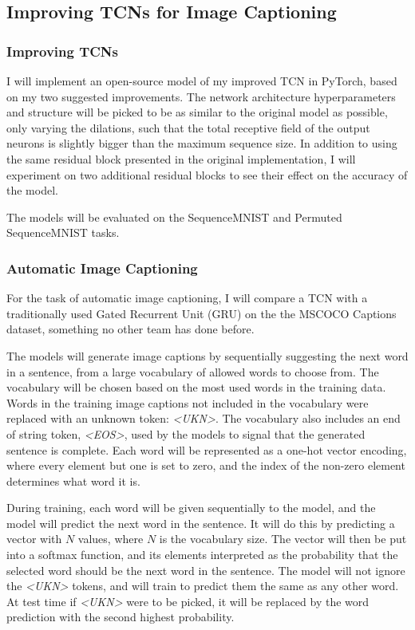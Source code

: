 \documentclass[a4paper, twoside]{article}
\begin{document}
\subsection{Improving TCNs for Image Captioning}
\subsubsection{Improving TCNs}
I will implement an open-source model of my improved TCN in PyTorch, based on my two suggested improvements. The network architecture hyperparameters and structure will be picked to be as similar to the original model as possible, only varying the dilations, such that the total receptive field of the output neurons is slightly bigger than the maximum sequence size. In addition to using the same residual block presented in the original implementation, I will experiment on two additional residual blocks to see their effect on the accuracy of the model.

The models will be evaluated on the SequenceMNIST and Permuted SequenceMNIST tasks.

\subsubsection{Automatic Image Captioning}
For the task of automatic image captioning, I will compare a TCN with a traditionally used Gated Recurrent Unit (GRU) on the the MSCOCO Captions dataset, something no other team has done before.

The models will generate image captions by sequentially suggesting the next word in a sentence, from a large vocabulary of allowed words to choose from. The vocabulary will be chosen based on the most used words in the training data. Words in the training image captions not included in the vocabulary were replaced with an unknown token: \textit{<UKN>}. The vocabulary also includes an end of string token, \textit{<EOS>}, used by the models to signal that the generated sentence is complete. Each word will be represented as a one-hot vector encoding, where every element but one is set to zero, and the index of the non-zero element determines what word it is.

During training, each word will be given sequentially to the model, and the model will predict the next word in the sentence. It will do this by predicting a vector with $N$ values, where $N$ is the vocabulary size. The vector will then be put into a softmax function, and its elements interpreted as the probability that the selected word should be the next word in the sentence. The model will not ignore the \textit{<UKN>} tokens, and will train to predict them the same as any other word. At test time if \textit{<UKN>} were to be picked, it will be replaced by the word prediction with the second highest probability.
\end{document}
